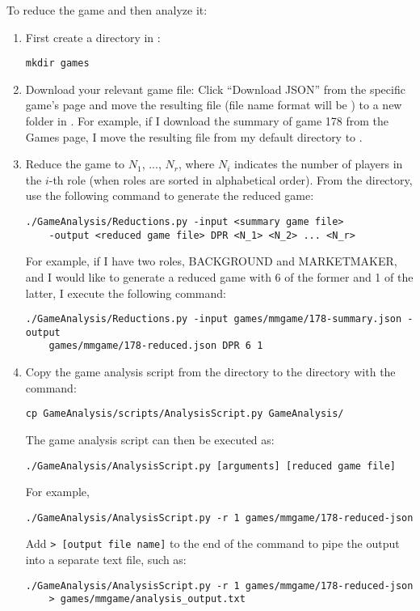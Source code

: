 \documentclass[11pt]{article}
\begin{document}
To reduce the game and then analyze it:
\begin{enumerate}
\item First create a directory  in :
\begin{verbatim}
mkdir games
\end{verbatim}
\item Download your relevant game file: Click ``Download JSON'' from the specific game's page and move the resulting file (file name format will be ) to a new folder in . For example, if I download the summary of game 178 from the Games page, I move the resulting  file from my default  directory to . 
\item Reduce the game to $N_1$, ..., $N_r$, where $N_i$ indicates the number of players in the $i$-th role (when roles are sorted in alphabetical order). From the  directory, use the following command to generate the reduced game:
\begin{verbatim}
./GameAnalysis/Reductions.py -input <summary game file> 
    -output <reduced game file> DPR <N_1> <N_2> ... <N_r>
\end{verbatim}
For example, if I have two roles, BACKGROUND and MARKETMAKER, and I would like to generate a reduced game with 6 of the former and 1 of the latter, I execute the following command:
\begin{verbatim}
./GameAnalysis/Reductions.py -input games/mmgame/178-summary.json -output 
    games/mmgame/178-reduced.json DPR 6 1
\end{verbatim}

\item Copy the game analysis script from the  directory to the  directory with the command:
\begin{verbatim}
cp GameAnalysis/scripts/AnalysisScript.py GameAnalysis/
\end{verbatim}
The game analysis script can then be executed as:
\begin{verbatim}
./GameAnalysis/AnalysisScript.py [arguments] [reduced game file]
\end{verbatim}
For example,
\begin{verbatim}
./GameAnalysis/AnalysisScript.py -r 1 games/mmgame/178-reduced-json
\end{verbatim}
Add \verb|> [output file name]| to the end of the command to pipe the output into a separate text file, such as:
\begin{verbatim}
./GameAnalysis/AnalysisScript.py -r 1 games/mmgame/178-reduced-json
    > games/mmgame/analysis_output.txt
\end{verbatim}
\end{enumerate}
\end{document}
